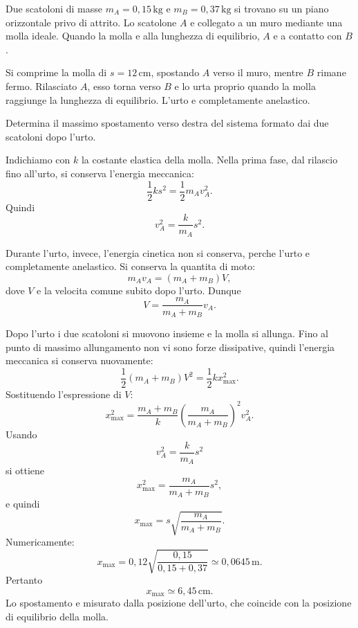 
\begin{esercizio}
Due scatoloni di masse \(m_A=0{,}15\,\mathrm{kg}\) e
\(m_B=0{,}37\,\mathrm{kg}\) si trovano su un piano orizzontale privo di
attrito. Lo scatolone \(A\) e collegato a un muro mediante una molla ideale.
Quando la molla e alla lunghezza di equilibrio, \(A\) e a contatto con \(B\).

Si comprime la molla di \(s=12\,\mathrm{cm}\), spostando \(A\) verso il muro,
mentre \(B\) rimane fermo. Rilasciato \(A\), esso torna verso \(B\) e lo urta
proprio quando la molla raggiunge la lunghezza di equilibrio. L'urto e
completamente anelastico.

Determina il massimo spostamento verso destra del sistema formato dai due
scatoloni dopo l'urto.
\end{esercizio}

\begin{soluzione}
Indichiamo con \(k\) la costante elastica della molla. Nella prima fase, dal
rilascio fino all'urto, si conserva l'energia meccanica:
\[
\frac12ks^2=\frac12m_Av_A^2.
\]
Quindi
\[
v_A^2=\frac{k}{m_A}s^2.
\]

Durante l'urto, invece, l'energia cinetica non si conserva, perche l'urto e
completamente anelastico. Si conserva la quantita di moto:
\[
m_Av_A=(m_A+m_B)V,
\]
dove \(V\) e la velocita comune subito dopo l'urto. Dunque
\[
V=\frac{m_A}{m_A+m_B}v_A.
\]

Dopo l'urto i due scatoloni si muovono insieme e la molla si allunga. Fino al
punto di massimo allungamento non vi sono forze dissipative, quindi l'energia
meccanica si conserva nuovamente:
\[
\frac12(m_A+m_B)V^2=\frac12kx_{\max}^2.
\]
Sostituendo l'espressione di \(V\):
\[
x_{\max}^2
=\frac{m_A+m_B}{k}
\left(\frac{m_A}{m_A+m_B}\right)^2v_A^2.
\]
Usando
\[
v_A^2=\frac{k}{m_A}s^2
\]
si ottiene
\[
x_{\max}^2=\frac{m_A}{m_A+m_B}s^2,
\]
e quindi
\[
x_{\max}=s\sqrt{\frac{m_A}{m_A+m_B}}.
\]
Numericamente:
\[
x_{\max}=0{,}12
\sqrt{\frac{0{,}15}{0{,}15+0{,}37}}
\simeq0{,}0645\,\mathrm{m}.
\]
Pertanto
\[
\boxed{x_{\max}\simeq6{,}45\,\mathrm{cm}}.
\]
Lo spostamento e misurato dalla posizione dell'urto, che coincide con la
posizione di equilibrio della molla.
\end{soluzione}
